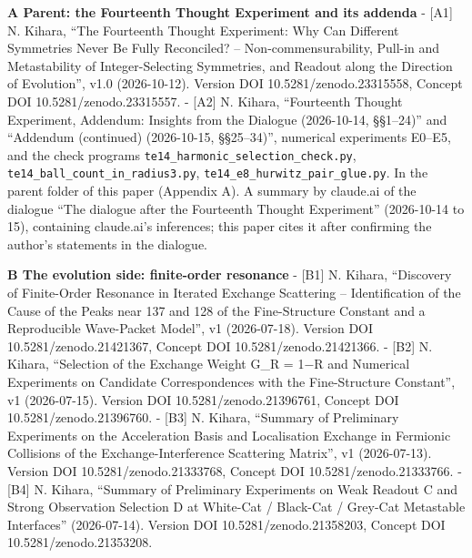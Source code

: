\documentclass[
  a4paper,
]{article}
\begin{document}
\textbf{A Parent: the Fourteenth Thought Experiment and its addenda} -
{[}A1{]} N. Kihara, ``The Fourteenth Thought Experiment: Why Can
Different Symmetries Never Be Fully Reconciled? -- Non-commensurability,
Pull-in and Metastability of Integer-Selecting Symmetries, and Readout
along the Direction of Evolution'', v1.0 (2026-10-12). Version DOI
10.5281/zenodo.23315558, Concept DOI 10.5281/zenodo.23315557. - {[}A2{]}
N. Kihara, ``Fourteenth Thought Experiment, Addendum: Insights from the
Dialogue (2026-10-14, §§1--24)'' and ``Addendum (continued) (2026-10-15,
§§25--34)'', numerical experiments E0--E5, and the check programs
\texttt{te14\_\allowbreak{}harmonic\_\allowbreak{}selection\_\allowbreak{}check.py},
\texttt{te14\_\allowbreak{}ball\_\allowbreak{}count\_\allowbreak{}in\_\allowbreak{}radius3.py},
\texttt{te14\_\allowbreak{}e8\_\allowbreak{}hurwitz\_\allowbreak{}pair\_\allowbreak{}glue.py}. In the parent folder of this
paper (Appendix A). A summary by claude.ai of the dialogue ``The
dialogue after the Fourteenth Thought Experiment'' (2026-10-14 to 15),
containing claude.ai's inferences; this paper cites it after confirming
the author's statements in the dialogue.

\textbf{B The evolution side: finite-order resonance} - {[}B1{]} N.
Kihara, ``Discovery of Finite-Order Resonance in Iterated Exchange
Scattering -- Identification of the Cause of the Peaks near 137 and 128
of the Fine-Structure Constant and a Reproducible Wave-Packet Model'',
v1 (2026-07-18). Version DOI 10.5281/zenodo.21421367, Concept DOI
10.5281/zenodo.21421366. - {[}B2{]} N. Kihara, ``Selection of the
Exchange Weight G\_R = 1−R and Numerical Experiments on Candidate
Correspondences with the Fine-Structure Constant'', v1 (2026-07-15).
Version DOI 10.5281/zenodo.21396761, Concept DOI
10.5281/zenodo.21396760. - {[}B3{]} N. Kihara, ``Summary of Preliminary
Experiments on the Acceleration Basis and Localisation Exchange in
Fermionic Collisions of the Exchange-Interference Scattering Matrix'',
v1 (2026-07-13). Version DOI 10.5281/zenodo.21333768, Concept DOI
10.5281/zenodo.21333766. - {[}B4{]} N. Kihara, ``Summary of Preliminary
Experiments on Weak Readout C and Strong Observation Selection D at
White-Cat / Black-Cat / Grey-Cat Metastable Interfaces'' (2026-07-14).
Version DOI 10.5281/zenodo.21358203, Concept DOI
10.5281/zenodo.21353208.
\end{document}
